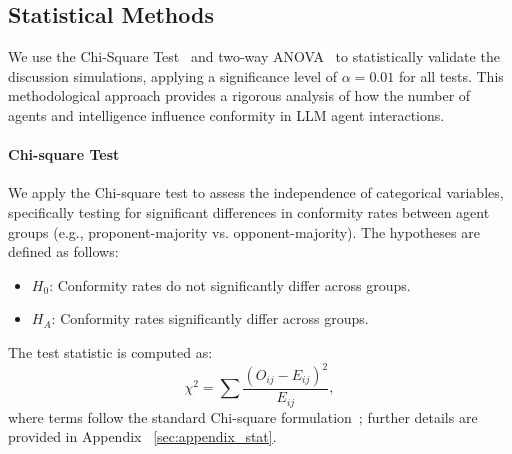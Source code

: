 \documentclass[11pt]{article}
\begin{document}
\subsection{Statistical Methods}
We use the Chi-Square Test~\citep{pearson1900x} and two-way ANOVA~\citep{fisher1941statistical} to statistically validate the discussion simulations, applying a significance level of \(\alpha = 0.01\) for all tests. This methodological approach provides a rigorous analysis of how the number of agents and intelligence influence conformity in LLM agent interactions.

\paragraph{Chi-square Test}
We apply the Chi-square test to assess the independence of categorical variables, specifically testing for significant differences in conformity rates between agent groups (e.g., proponent-majority vs. opponent-majority). The hypotheses are defined as follows:
\begin{itemize}  
    \item \(H_0\): Conformity rates do not significantly differ across groups.  
    \item \(H_A\): Conformity rates significantly differ across groups.  
\end{itemize}  
The test statistic is computed as:
\[
\chi^2 = \sum \frac{(O_{ij} - E_{ij})^2}{E_{ij}},
\]
where terms follow the standard Chi-square formulation~\citep{pearson1900x}; further details are provided in Appendix ~\ref{sec:appendix_stat}.



\end{document}
